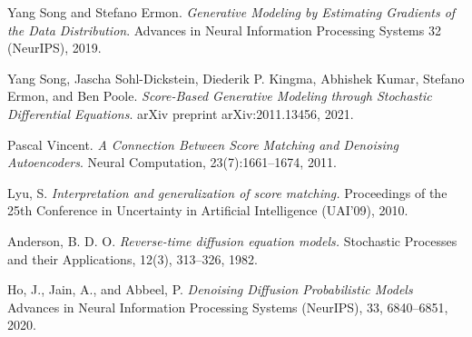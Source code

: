 \documentclass{article}
\begin{document}
\newpage


\begin{thebibliography}{9}

    Yang Song and Stefano Ermon. 
    \textit{Generative Modeling by Estimating Gradients of the Data Distribution}. 
    Advances in Neural Information Processing Systems 32 (NeurIPS), 2019.

    Yang Song, Jascha Sohl-Dickstein, Diederik P. Kingma, Abhishek Kumar, Stefano Ermon, and Ben Poole.
    \textit{Score-Based Generative Modeling through Stochastic Differential Equations}. 
    arXiv preprint arXiv:2011.13456, 2021.

    Pascal Vincent. 
    \textit{A Connection Between Score Matching and Denoising Autoencoders}. 
    Neural Computation, 23(7):1661–1674, 2011.

    Lyu, S.
    \textit{Interpretation and generalization of score matching.}
    Proceedings of the 25th Conference in Uncertainty in Artificial Intelligence (UAI'09), 2010.

    Anderson, B. D. O.
    \textit{Reverse-time diffusion equation models.}
    Stochastic Processes and their Applications, 12(3), 313–326, 1982.

    Ho, J., Jain, A., and Abbeel, P.
    \textit{Denoising Diffusion Probabilistic Models}
    Advances in Neural Information Processing Systems (NeurIPS), 33, 6840–6851, 2020.

\end{thebibliography}
\end{document}
